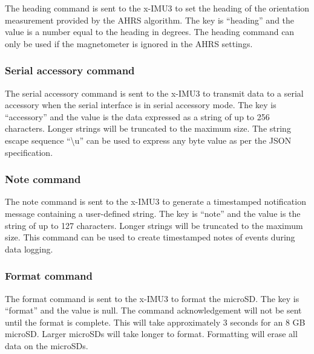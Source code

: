 The heading command is sent to the x-IMU3 to set the heading of the orientation measurement provided by the \ac{AHRS} algorithm.  The key is \enquote{heading} and the value is a number equal to the heading in degrees.  The heading command can only be used if the magnetometer is ignored in the \ac{AHRS} settings.


\subsubsection{Serial accessory command}

The serial accessory command is sent to the x-IMU3 to transmit data to a serial accessory when the serial interface is in serial accessory mode.  The key is \enquote{accessory} and the value is the data expressed as a string of up to 256 characters.  Longer strings will be truncated to the maximum size.  The string escape sequence \enquote{\textbackslash u} can be used to express any byte value as per the \ac{JSON} specification.


\subsubsection{Note command}

The note command is sent to the x-IMU3 to generate a timestamped notification message containing a user-defined string.  The key is \enquote{note} and the value is the string of up to 127 characters.  Longer strings will be truncated to the maximum size.  This command can be used to create timestamped notes of events during data logging.


\subsubsection{Format command}

The format command is sent to the x-IMU3 to format the \ac{microSD}.  The key is \enquote{format} and the value is null.  The command acknowledgement will not be sent until the format is complete.  This will take approximately 3 seconds for an 8 GB \ac{microSD}.  Larger \acp{microSD} will take longer to format.  Formatting will erase all data on the \acp{microSD}.

